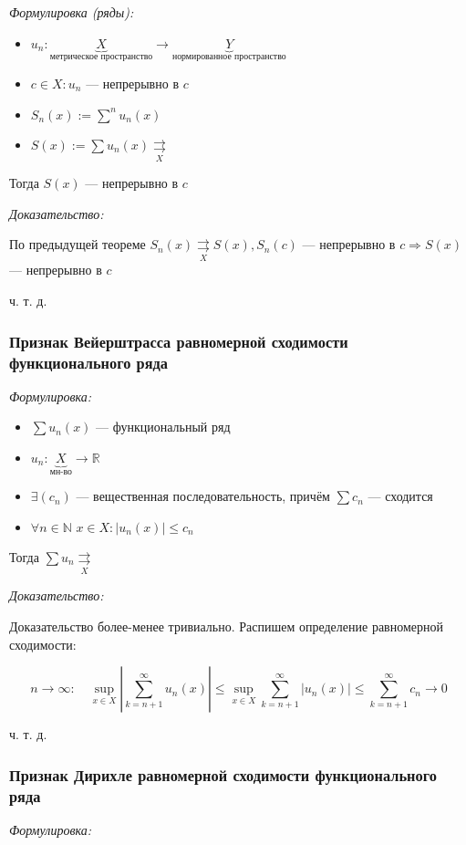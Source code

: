 \documentclass{article}
\def\dbl{\,\,}
\def\rsh#1{\underset{#1}{\rightrightarrows}}
\begin{document}
\textit{Формулировка (ряды):}

\begin{itemize}
    \item $u_n: \underbrace{X}_{\text{метрическое пространство}} \rightarrow \underbrace{Y}_{\text{нормированное пространство}}$
    \item $c \in X: u_n$ --- непрерывно в $c$ 
    \item $S_n(x) := \sum^n u_n(x)$
    \item $S(x) := \sum u_n(x) \rsh{X}$
\end{itemize}

Тогда $S(x)$ --- непрерывно в $c$

\textit{Доказательство:}

По предыдущей теореме $S_n(x) \rsh{X} S(x), S_n(c)$ --- непрерывно в $c \Rightarrow S(x)$ --- непрерывно в $c$

ч. т. д.

\subsubsection{Признак Вейерштрасса равномерной сходимости функционального ряда}
\textit{Формулировка:}

\begin{itemize}
    \item $\sum u_n(x)$ --- функциональный ряд
    \item $u_n: \underbrace{X}_{\text{мн-во}} \rightarrow \mathbb{R}$
    \item $\exists (c_n)$ --- вещественная последовательность, причём $\sum c_n$ --- сходится
    \item $\forall n \in \mathbb{N} \dbl x \in X: |u_n(x)| \le c_n$
\end{itemize}

Тогда $\sum u_n \rsh{X}$

\textit{Доказательство:}

Доказательство более-менее тривиально. Распишем определение равномерной сходимости:

\[n \rightarrow \infty: \quad \sup_{x \in X} \left| \sum_{k = n + 1}^{\infty} u_n(x) \right| \le \sup_{x \in X} \sum_{k = n + 1}^{\infty} \left| u_n(x) \right| \le \sum_{k = n + 1}^{\infty} c_n \longrightarrow 0\]

ч. т. д.

\subsubsection{Признак Дирихле равномерной сходимости функционального ряда}
\textit{Формулировка:}
\end{document}
